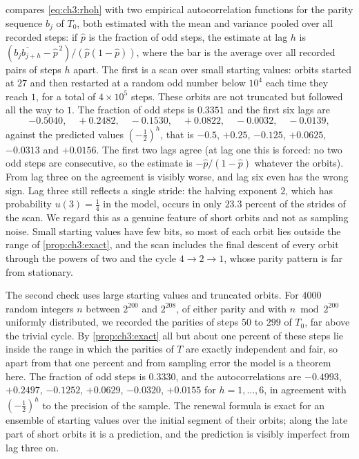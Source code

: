  compares \eqref{eq:ch3:rhoh} with two empirical
autocorrelation functions for the parity sequence $b_j$ of $T_0$, both
estimated with the mean and variance pooled over all recorded steps: if $\hat p$
is the fraction of odd steps, the estimate at lag $h$ is
$(\overline{b_jb_{j+h}}-\hat p^{\,2})/(\hat p(1-\hat p))$, where the bar is the
average over all recorded pairs of steps $h$ apart. The first is a scan
over small starting values: orbits started at $27$ and then restarted at a
random odd number below $10^4$ each time they reach $1$, for a total of
$4\times10^5$ steps. These orbits are not truncated but followed all the way to
$1$. The fraction of odd steps is $0.3351$ and the first six lags are
\[
  -0.5040,\quad+0.2482,\quad-0.1530,\quad+0.0822,\quad-0.0032,\quad-0.0139,
\]
against the predicted values $(-\tfrac12)^h$, that is $-0.5$, $+0.25$, $-0.125$,
$+0.0625$, $-0.0313$ and $+0.0156$.
The first two lags agree (at lag one this is forced: no two odd steps are consecutive, so the estimate is $-\hat p/(1-\hat p)$ whatever the orbits).
From lag three on the agreement is visibly worse, and lag six even has the wrong sign.
Lag three still reflects a single stride: the halving exponent $2$, which has probability $u(3)=\tfrac14$ in the model, occurs in only $23.3$ percent of the strides of the scan. We regard
this as a genuine feature of short orbits and not as sampling noise. Small
starting values have few bits, so most of each orbit lies outside the range of
\cref{prop:ch3:exact}, and the scan includes the final descent of every orbit
through the powers of two and the cycle $4\to2\to1$, whose parity pattern is
far from stationary.

The second check uses large starting values and truncated orbits. For $4000$
random integers $n$ between $2^{200}$ and $2^{208}$, of either parity and with
$n\bmod2^{200}$ uniformly distributed, we recorded the parities of steps $50$ to
$299$ of $T_0$, far above the trivial cycle. By \cref{prop:ch3:exact} all but
about one percent of these steps lie inside the range in
which the parities of $T$ are exactly independent and fair, so apart from that
one percent and from sampling error the model is a theorem here. The fraction of odd steps is $0.3330$, and
the autocorrelations are $-0.4993$, $+0.2497$, $-0.1252$, $+0.0629$,
$-0.0320$, $+0.0155$ for $h=1,\ldots,6$, in agreement with $(-\tfrac12)^h$ to
the precision of the sample. The renewal
formula is exact for an ensemble of starting values over the initial segment
of their orbits; along the late part of short orbits it is a prediction, and
the prediction is visibly imperfect from lag three on.

